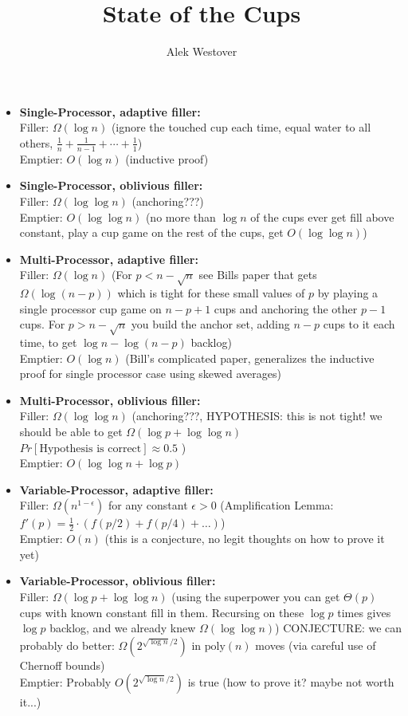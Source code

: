 \documentclass{article}[11pt]
\author{Alek Westover}
\title{State of the Cups}
\begin{document}
\maketitle

\begin{itemize}
  \item \textbf{Single-Processor, adaptive filler: } \\
    Filler: $\Omega(\log n)$ (ignore the touched cup each time, equal water to
    all others, $\frac{1}{n}+\frac{1}{n-1}  + \cdots + \frac{1}{1}$)\\
    Emptier: $O(\log n)$ (inductive proof)
  \item \textbf{Single-Processor, oblivious filler: } \\
    Filler: $\Omega(\log\log n)$ (anchoring???) \\
    Emptier: $O(\log\log n)$ (no more than $\log n$ of the cups ever get fill above constant, play a cup game on the rest of the cups, get $O(\log \log n)$)
  \item \textbf{Multi-Processor, adaptive filler: } \\
    Filler: $\Omega(\log n)$ (For $p < n-\sqrt{n}$ see Bills paper that gets
    $\Omega(\log (n-p))$ which is tight for these small values of $p$ by
    playing a single processor cup game on $n-p+1$ cups and anchoring the other
    $p-1$ cups. For $p>n-\sqrt{n}$ you build the anchor set, adding $n-p$ cups
    to it each time, to get $\log n - \log (n-p)$ backlog)\\
    Emptier: $O(\log n)$ (Bill's complicated paper, generalizes the inductive
    proof for single processor case using skewed averages)
  \item \textbf{Multi-Processor, oblivious filler: } \\
    Filler: $\Omega(\log\log n)$ (anchoring???, HYPOTHESIS: this is not tight!
    we should be able to get $\Omega(\log p + \log \log n)$
    $Pr[\text{Hypothesis is correct}] \approx 0.5$ ) \\
    Emptier: $O(\log\log n + \log p)$  
  \item \textbf{Variable-Processor, adaptive filler: } \\
    Filler: $\Omega(n^{1-\epsilon})$ for any constant $\epsilon >0$ (Amplification Lemma: $f'(p) =
    \frac{1}{2}\cdot(f(p/2) + f(p/4) + \ldots)$) \\
    Emptier: $O(n)$ (this is a conjecture, no legit thoughts on how to prove it yet)
  \item \textbf{Variable-Processor, oblivious filler: } \\
    Filler: $\Omega(\log p + \log \log n)$ (using the superpower you can get
    $\Theta(p)$ cups with known constant fill in them. Recursing on these $\log
    p$ times gives $\log p$ backlog, and we already knew $\Omega(\log\log n)$)
    CONJECTURE: we can probably do better: $\Omega(2^{\sqrt{\log n} /2})$ in
    $\text{poly}(n)$ moves (via careful use of Chernoff bounds)\\
    Emptier: Probably $O(2^{\sqrt{\log n} /2})$ is true (how to prove it? maybe not worth it...)
  
\end{itemize}
\end{document}
